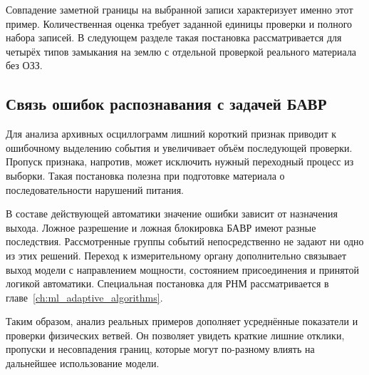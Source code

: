Совпадение заметной границы на выбранной записи
характеризует именно этот пример. Количественная оценка
требует заданной единицы проверки и полного набора записей.
В следующем разделе такая постановка рассматривается
для четырёх типов замыкания на землю с отдельной
проверкой реального материала без ОЗЗ.

\subsection{Связь ошибок распознавания с задачей БАВР}
\label{sec:ch4_event_errors_bavr}


Для анализа архивных осциллограмм лишний короткий признак
приводит к ошибочному выделению события и увеличивает
объём последующей проверки. Пропуск признака, напротив,
может исключить нужный переходный процесс из выборки.
Такая постановка полезна при подготовке материала
о последовательности нарушений питания.

В составе действующей автоматики значение ошибки
зависит от назначения выхода. Ложное разрешение
и ложная блокировка БАВР имеют разные последствия.
Рассмотренные группы событий непосредственно
не задают ни одно из этих решений.
Переход к измерительному органу дополнительно
связывает выход модели с направлением мощности,
состоянием присоединения и принятой логикой автоматики.
Специальная постановка для РНМ рассматривается
в главе~\ref{ch:ml_adaptive_algorithms}.

Таким образом, анализ реальных примеров дополняет
усреднённые показатели и проверки физических ветвей.
Он позволяет увидеть краткие лишние отклики,
пропуски и несовпадения границ, которые могут
по-разному влиять на дальнейшее использование модели.

{}

